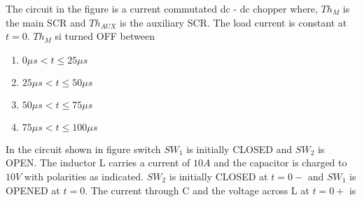     \item 
    The circuit in the figure is a current commutated dc - dc chopper where, $Th_M$ is the main SCR and $Th_{AUX}$ is the auxiliary SCR. The load current is constant at $t = 0$. $Th_M$ si turned OFF between 
    \begin{figure}[H]
    \centering
    \end{figure}
    \hfill{}
    \begin{enumerate}
        \item $0\mu s < t \leq 25\mu s$
        \item $25\mu s < t \leq 50\mu s$
        \item $50\mu s < t \leq 75\mu s$
        \item $75\mu s < t \leq 100\mu s$
    \end{enumerate}

    \item 
    In the circuit shown in figure switch $SW_1$ is initially CLOSED and $SW_2$ is OPEN. The inductor L carries a current of $10 A$ and the capacitor is charged to $10V$ with polarities as indicated. $SW_2$ is initially CLOSED at $t = 0-$ and $SW_1$ is OPENED at $t = 0$. The current through C and the voltage across L at $t = 0+$ is

